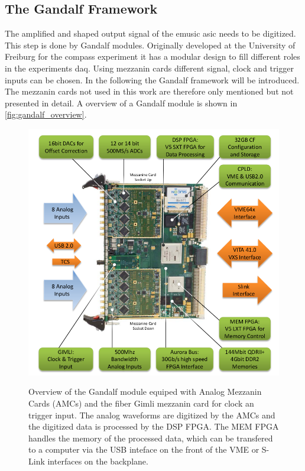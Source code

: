 \subsection{The Gandalf Framework}
The amplified and shaped output signal of the \ac{emusic} \ac{asic} needs to be digitized.
This step is done by Gandalf modules.
Originally developed at the University of Freiburg for the \ac{compass} experiment it has a modular design to fill different roles in the experiments \ac{daq}.
Using mezzanin cards different signal, clock and trigger inputs can be chosen.
In the following the Gandalf framework will be introduced.
The mezzanin cards not used in this work are therefore only mentioned but not presented in detail.
A overview of a Gandalf module is shown in \autoref{fig:gandalf_overview}.
\begin{figure}
	\centering
	\includegraphics[width=1.\linewidth]{pictures/gandalf_overview.png}
	\label{fig:gandalf_overview}
	\caption{Overview of the Gandalf module equiped with Analog Mezzanin Cards (AMCs) and the fiber Gimli mezzanin card for clock an trigger input. The analog waveforms are digitized by the AMCs and the digitized data is processed by the DSP FPGA. The MEM FPGA handles the memory of the processed data, which can be transfered to a computer via the USB inteface on the front of the VME or S-Link interfaces on the backplane. \cite{herrmann}}
\end{figure}

